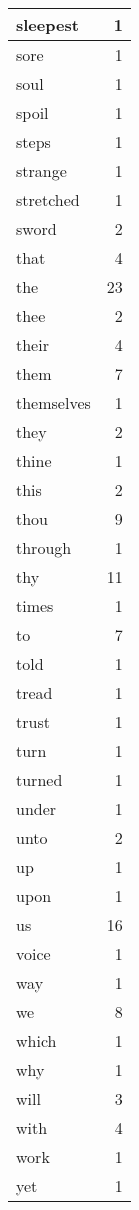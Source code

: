 \begin{center}
\begin{longtable}{l|r}
sleepest & 1 \\ \hline
sore & 1 \\ \hline
soul & 1 \\ \hline
spoil & 1 \\ \hline
steps & 1 \\ \hline
strange & 1 \\ \hline
stretched & 1 \\ \hline
sword & 2 \\ \hline
that & 4 \\ \hline
the & 23 \\ \hline
thee & 2 \\ \hline
their & 4 \\ \hline
them & 7 \\ \hline
themselves & 1 \\ \hline
they & 2 \\ \hline
thine & 1 \\ \hline
this & 2 \\ \hline
thou & 9 \\ \hline
through & 1 \\ \hline
thy & 11 \\ \hline
times & 1 \\ \hline
to & 7 \\ \hline
told & 1 \\ \hline
tread & 1 \\ \hline
trust & 1 \\ \hline
turn & 1 \\ \hline
turned & 1 \\ \hline
under & 1 \\ \hline
unto & 2 \\ \hline
up & 1 \\ \hline
upon & 1 \\ \hline
us & 16 \\ \hline
voice & 1 \\ \hline
way & 1 \\ \hline
we & 8 \\ \hline
which & 1 \\ \hline
why & 1 \\ \hline
will & 3 \\ \hline
with & 4 \\ \hline
work & 1 \\ \hline
yet & 1 \\ \hline
\end{longtable}
\end{center}



